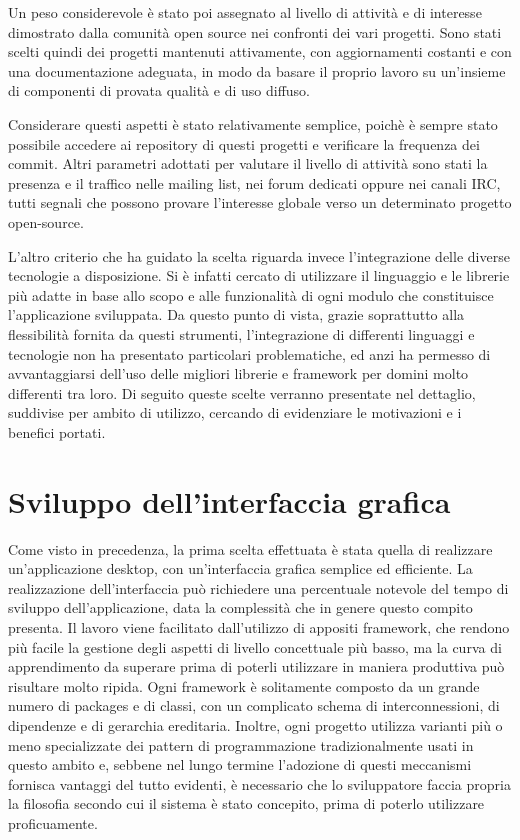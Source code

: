\documentclass[12pt]{toptesi}
\begin{document}
Un peso considerevole è stato poi assegnato al livello di attività e di interesse dimostrato dalla comunità open source nei confronti dei vari progetti. Sono stati scelti quindi dei progetti mantenuti attivamente, con aggiornamenti costanti e con una documentazione adeguata, in modo da basare il proprio lavoro su un'insieme di componenti di provata qualità e di uso diffuso. 

Considerare questi aspetti è stato relativamente semplice, poichè è sempre stato possibile accedere ai repository di questi progetti e verificare la frequenza dei commit. Altri parametri adottati per valutare il livello di attività sono stati la presenza e il traffico nelle mailing list, nei forum dedicati oppure nei canali IRC, tutti segnali che possono provare l'interesse globale verso un determinato progetto open-source.

L'altro criterio che ha guidato la scelta riguarda invece l'integrazione delle diverse tecnologie a disposizione. Si è infatti cercato di utilizzare il linguaggio e le librerie più adatte in base allo scopo e alle funzionalità di ogni modulo che constituisce l'applicazione sviluppata. Da questo punto di vista, grazie soprattutto alla flessibilità fornita da questi strumenti, l'integrazione di differenti linguaggi e tecnologie non ha presentato particolari problematiche, ed anzi ha permesso di avvantaggiarsi dell'uso delle migliori librerie e framework per domini molto differenti tra loro. Di seguito queste scelte verranno presentate nel dettaglio, suddivise per ambito di utilizzo, cercando di evidenziare le motivazioni e i benefici portati.

\section{Sviluppo dell'interfaccia grafica}

Come visto in precedenza, la prima scelta effettuata è stata quella di realizzare un'applicazione desktop, con un'interfaccia grafica semplice ed efficiente. La realizzazione dell'interfaccia può richiedere una percentuale notevole del tempo di sviluppo dell'applicazione, data la complessità che in genere questo compito presenta. Il lavoro viene facilitato dall'utilizzo di appositi framework, che rendono più facile la gestione degli aspetti di livello concettuale più basso, ma la curva di apprendimento da superare prima di poterli utilizzare in maniera produttiva può risultare molto ripida. Ogni framework è solitamente composto da un grande numero di packages e di classi, con un complicato schema di interconnessioni, di dipendenze e di gerarchia ereditaria. Inoltre, ogni progetto utilizza varianti più o meno specializzate dei pattern di programmazione tradizionalmente usati in questo ambito e, sebbene nel lungo termine l'adozione di questi meccanismi fornisca vantaggi del tutto evidenti, è necessario che lo sviluppatore faccia propria la filosofia secondo cui il sistema è stato concepito, prima di poterlo utilizzare proficuamente.
\end{document}
